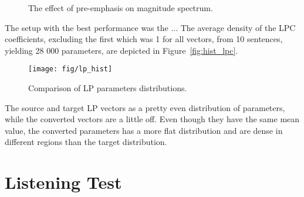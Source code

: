 \begin{figure}[htbp]
	\begin{center}
	\caption{The effect of pre-emphasis on magnitude spectrum.}
	\label{fig:the_effect_of_pre_emphasis_on_magnitude_spectrum_}
	\end{center}
\end{figure}


The setup with the best performance was the ... The average density of the LPC coefficients, excluding the first which was 1 for all vectors, from 10 sentences, yielding 28 000 parameters, are depicted in Figure~\ref{fig:hist_lpc}.
\begin{figure}[htbp]
	\begin{center}
		\texttt{[image: fig/lp\_hist]}
		\caption{Comparison of LP parameters distributions.}
		\label{fig:hist_lp}
	\end{center}
\end{figure}
The source and target LP vectors as a pretty even distribution of parameters, while the converted vectors are a little off. Even though they have the same mean value, the converted parameters has a more flat distribution and are dense in different regions than the target distribution.

\section{Listening Test} %
\label{sec:listening_test}

